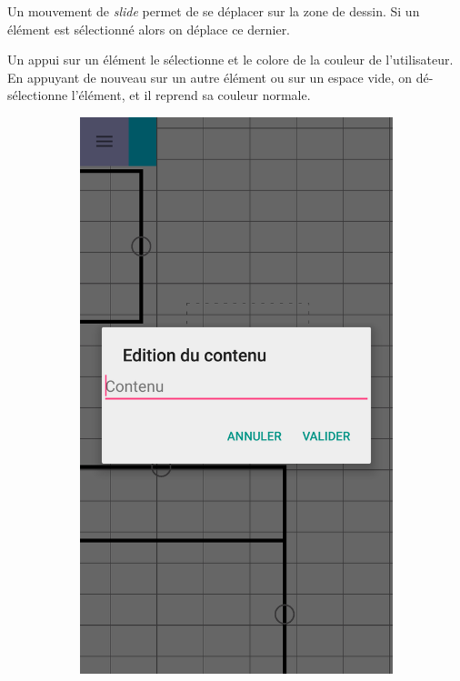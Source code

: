 Un mouvement de \textit{slide} permet de se déplacer sur la zone de dessin. Si un élément est sélectionné alors on déplace ce dernier.

Un appui sur un élément le sélectionne et le colore de la couleur de l'utilisateur. En appuyant de nouveau sur un autre élément ou sur un espace vide, on dé-sélectionne l'élément, et il reprend sa couleur normale.

\newpage
		\begin{figure}[!h]
			\centering
			\begin{subfigure}[t]{.27\textwidth}
				\includegraphics[width=\textwidth]{img/screen/colladia_draw_view_element_change_text}

\end{subfigure}
\end{figure}
